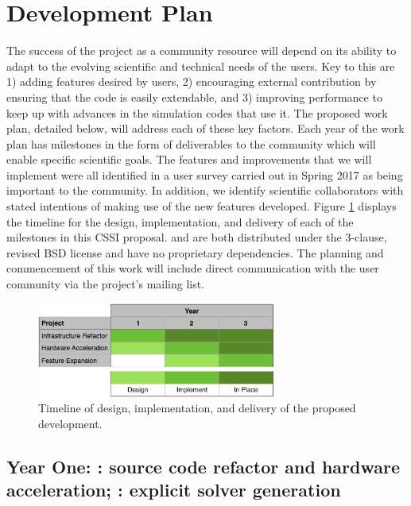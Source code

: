 \section{Development Plan}

The success of the \grackle{} project as a community resource will
depend on its ability to adapt to the evolving scientific and
technical needs of the users. Key to this are 1) adding features
desired by users, 2) encouraging external contribution by ensuring
that the code is easily extendable, and 3) improving performance to
keep up with advances in the simulation codes that use it.
The proposed work plan, detailed below, will address each of these key
factors. Each year of the work plan has milestones in the form of
deliverables to the community which will enable specific scientific
goals. The features and improvements that we will implement were all
identified in a \grackle{} user survey carried out in Spring 2017 as
being important to the community. In addition, we identify scientific
collaborators with stated intentions of making use of the new features
developed. Figure \ref{fig:gantt} displays the timeline for the
design, implementation, and delivery of each of the milestones in this
CSSI proposal. \grackle{} and \dengo{} are both distributed under the
3-clause, revised BSD license and have no proprietary
dependencies. The planning and commencement of this work will include
direct communication with the \grackle{} user community via the
project's mailing list.

\begin{figure}
\begin{center}
\includegraphics[width=0.7\textwidth]{figures/gantt.pdf}
\caption{Timeline of design, implementation, and delivery of the
  proposed development.}
\label{fig:gantt}
\end{center}
\vspace*{-2\baselineskip}
\end{figure}

\subsection{Year One: \grackle{}: source code refactor and hardware
  acceleration; \dengo{}: explicit solver generation}

